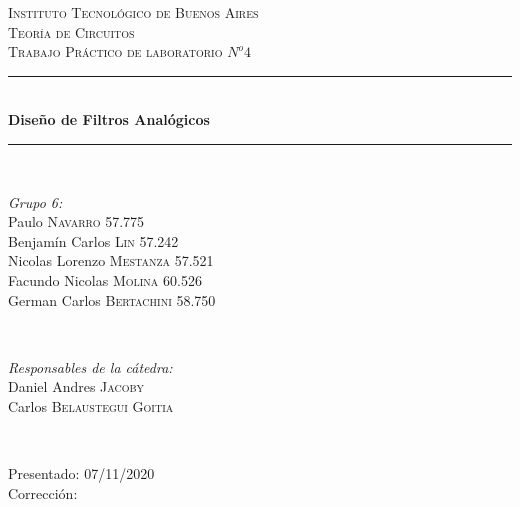 \begin{titlepage}
\newcommand{\HRule}{\rule{\linewidth}{0.5mm}}
\center
\textsc{\LARGE Instituto Tecnológico de Buenos Aires}\\[1.5cm]
\textsc{\Large Teoría de Circuitos}\\[0.5cm]
\textsc{\large Trabajo Práctico de laboratorio $N^o4$}\\[0.5cm]

\HRule \\[0.4cm]
{ \huge \bfseries Diseño de Filtros Analógicos}\\[0.1cm] %
\HRule \\[1.5cm]

\begin{minipage}{0.4\textwidth}
\begin{flushleft} \large
\emph{Grupo 6:}\\
Paulo \textsc{Navarro} 57.775\\
Benjamín Carlos \textsc{Lin} 57.242\\
Nicolas Lorenzo  \textsc{Mestanza} 57.521\\
Facundo Nicolas \textsc{Molina} 60.526\\
German Carlos  \textsc{Bertachini} 58.750\\
\end{flushleft}
\end{minipage}
~
\begin{minipage}{0.4\textwidth}
\begin{flushright} \large
\emph{Responsables de la cátedra:} \\
Daniel Andres \textsc{Jacoby}\\
Carlos \textsc{Belaustegui Goitia}\\

\end{flushright}
\end{minipage}\\[4cm]

\begin{minipage}{0.4\textwidth}
\begin{flushleft} \large
Presentado: 07/11/2020\\
Corrección:\\
\end{flushleft}
\end{minipage}
\vfill %

\end{titlepage}
